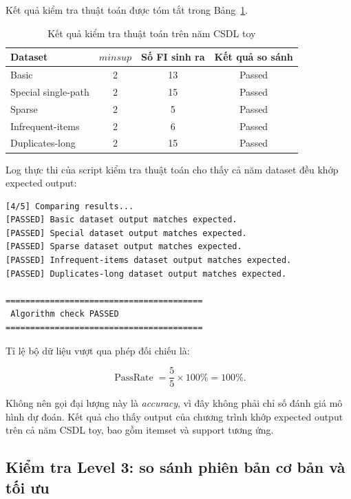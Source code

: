 Kết quả kiểm tra thuật toán được tóm tắt trong Bảng~\ref{tab:algorithm-check-results}.

\begin{table}[H]
\centering
\caption{Kết quả kiểm tra thuật toán trên năm CSDL toy}
\label{tab:algorithm-check-results}
\begin{tabular}{lccc}
\toprule
Dataset & $\mathit{minsup}$ & Số FI sinh ra & Kết quả so sánh \\
\midrule
Basic & 2 & 13 & Passed \\
Special single-path & 2 & 15 & Passed \\
Sparse & 2 & 5 & Passed \\
Infrequent-items & 2 & 6 & Passed \\
Duplicates-long & 2 & 15 & Passed \\
\bottomrule
\end{tabular}
\end{table}

Log thực thi của script kiểm tra thuật toán cho thấy cả năm dataset đều khớp expected output:

\begin{lstlisting}[caption={Kết quả chạy script kiểm tra thuật toán}, label={lst:algorithm-check-log}]
[4/5] Comparing results...
[PASSED] Basic dataset output matches expected.
[PASSED] Special dataset output matches expected.
[PASSED] Sparse dataset output matches expected.
[PASSED] Infrequent-items dataset output matches expected.
[PASSED] Duplicates-long dataset output matches expected.

========================================
 Algorithm check PASSED
========================================
\end{lstlisting}

Tỉ lệ bộ dữ liệu vượt qua phép đối chiếu là:

\begin{equation}
    \operatorname{PassRate}
    =
    \frac{5}{5}\times100\%
    =
    100\%.
    \label{eq:level2-pass-rate}
\end{equation}

Không nên gọi đại lượng này là \textit{accuracy}, vì đây không phải chỉ số đánh
giá mô hình dự đoán. Kết quả cho thấy output của chương trình khớp expected
output trên cả năm CSDL toy, bao gồm itemset và support tương ứng.

\subsection{Kiểm tra Level 3: so sánh phiên bản cơ bản và tối ưu}
\label{subsec:level3-optimization}

